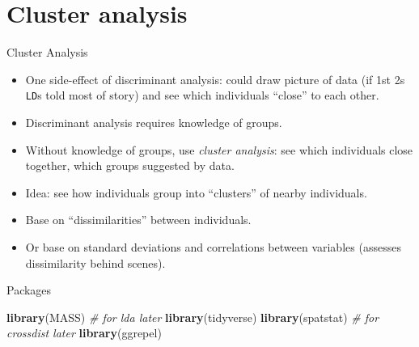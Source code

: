 \documentclass[ignorenonframetext,]{beamer}
\newenvironment{Shaded}{\begin{snugshade}}{\end{snugshade}}
\newcommand{\CommentTok}[1]{\textcolor[rgb]{0.56,0.35,0.01}{\textit{#1}}}
\newcommand{\KeywordTok}[1]{\textcolor[rgb]{0.13,0.29,0.53}{\textbf{#1}}}
\newcommand{\NormalTok}[1]{#1}
\begin{document}
\hypertarget{cluster-analysis}{%
\section{Cluster analysis}\label{cluster-analysis}}

\begin{frame}[fragile]{Cluster Analysis}
\protect\hypertarget{cluster-analysis-1}{}

\begin{itemize}
\item
  One side-effect of discriminant analysis: could draw picture of data
  (if 1st 2s \texttt{LD}s told most of story) and see which individuals
  ``close'' to each other.
\item
  Discriminant analysis requires knowledge of groups.
\item
  Without knowledge of groups, use \emph{cluster analysis}: see which
  individuals close together, which groups suggested by data.
\item
  Idea: see how individuals group into ``clusters'' of nearby
  individuals.
\item
  Base on ``dissimilarities'' between individuals.
\item
  Or base on standard deviations and correlations between variables
  (assesses dissimilarity behind scenes).
\end{itemize}

\end{frame}

\begin{frame}[fragile]{Packages}
\protect\hypertarget{packages-7}{}

\begin{Shaded}
\begin{Highlighting}[]
\KeywordTok{library}\NormalTok{(MASS) }\CommentTok{# for lda later}
\KeywordTok{library}\NormalTok{(tidyverse)}
\KeywordTok{library}\NormalTok{(spatstat) }\CommentTok{# for crossdist later}
\KeywordTok{library}\NormalTok{(ggrepel)}
\end{Highlighting}
\end{Shaded}

\end{frame}
\end{document}
